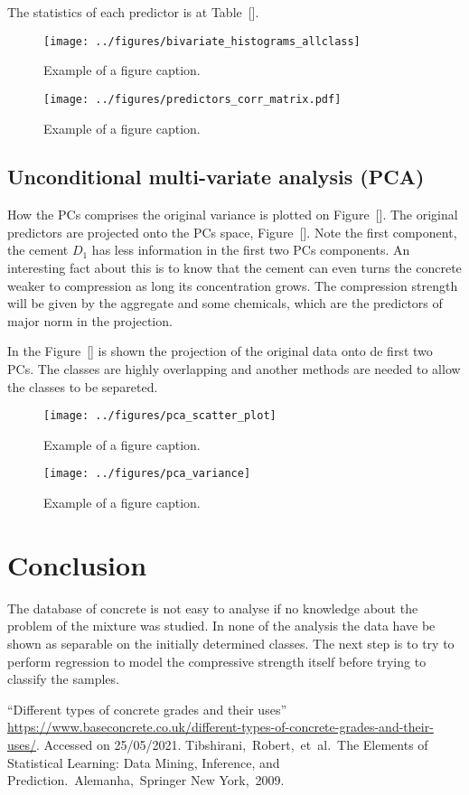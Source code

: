 \documentclass[conference]{IEEEtran}
\begin{document}
The statistics of each predictor is at Table~[].

\begin{figure}[htbp]
\centerline{\texttt{[image: ../figures/bivariate\_histograms\_allclass]}}
\caption{Example of a figure caption.}
\end{figure}

\begin{figure}[htbp]
\centerline{\texttt{[image: ../figures/predictors\_corr\_matrix.pdf]}}
\caption{Example of a figure caption.}
\label{fig}
\end{figure}

\subsection{Unconditional multi-variate analysis (PCA)}

How the PCs comprises the original variance is plotted on Figure~[]. The original predictors are projected onto the PCs space, Figure~[]. Note the first component, the cement $D_1$ has less information in the first two PCs components. An interesting fact about this is to know that the cement can even turns the concrete weaker to compression as long its concentration grows. The compression strength will be given by the aggregate and some chemicals, which are the predictors of major norm in the projection.

In the Figure~[] is shown the projection of the original data onto de first two PCs. The classes are highly overlapping and another methods are needed to allow the classes to be separeted.

\begin{figure}[htbp]
\centerline{\texttt{[image: ../figures/pca\_scatter\_plot]}}
\caption{Example of a figure caption.}
\end{figure}

\begin{figure}[htbp]
\centerline{\texttt{[image: ../figures/pca\_variance]}}
\caption{Example of a figure caption.}
\end{figure}

\section{Conclusion}

The database of concrete is not easy to analyse if no knowledge about the problem of the mixture was studied. In none of the analysis the data have be shown as separable on the initially determined classes. The next step is to try to perform regression to model the compressive strength itself before trying to classify the samples.

\begin{thebibliography}{00}
 ``Different types of concrete grades and their uses'' \url{https://www.baseconcrete.co.uk/different-types-of-concrete-grades-and-their-uses/}. Accessed on 25/05/2021.
 Tibshirani, Robert, et al. The Elements of  Statistical Learning:  Data Mining, Inference, and Prediction. Alemanha, Springer New York, 2009.
\end{thebibliography}
\end{document}
